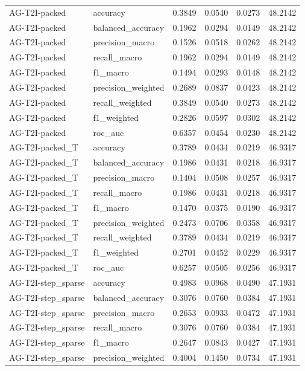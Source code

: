 \begin{tabular}{llrrrr}
AG-T2I-packed & accuracy & 0.3849 & 0.0540 & 0.0273 & 48.2142 \\
AG-T2I-packed & balanced_accuracy & 0.1962 & 0.0294 & 0.0149 & 48.2142 \\
AG-T2I-packed & precision_macro & 0.1526 & 0.0518 & 0.0262 & 48.2142 \\
AG-T2I-packed & recall_macro & 0.1962 & 0.0294 & 0.0149 & 48.2142 \\
AG-T2I-packed & f1_macro & 0.1494 & 0.0293 & 0.0148 & 48.2142 \\
AG-T2I-packed & precision_weighted & 0.2689 & 0.0837 & 0.0423 & 48.2142 \\
AG-T2I-packed & recall_weighted & 0.3849 & 0.0540 & 0.0273 & 48.2142 \\
AG-T2I-packed & f1_weighted & 0.2826 & 0.0597 & 0.0302 & 48.2142 \\
AG-T2I-packed & roc_auc & 0.6357 & 0.0454 & 0.0230 & 48.2142 \\
AG-T2I-packed_T & accuracy & 0.3789 & 0.0434 & 0.0219 & 46.9317 \\
AG-T2I-packed_T & balanced_accuracy & 0.1986 & 0.0431 & 0.0218 & 46.9317 \\
AG-T2I-packed_T & precision_macro & 0.1404 & 0.0508 & 0.0257 & 46.9317 \\
AG-T2I-packed_T & recall_macro & 0.1986 & 0.0431 & 0.0218 & 46.9317 \\
AG-T2I-packed_T & f1_macro & 0.1470 & 0.0375 & 0.0190 & 46.9317 \\
AG-T2I-packed_T & precision_weighted & 0.2473 & 0.0706 & 0.0358 & 46.9317 \\
AG-T2I-packed_T & recall_weighted & 0.3789 & 0.0434 & 0.0219 & 46.9317 \\
AG-T2I-packed_T & f1_weighted & 0.2701 & 0.0452 & 0.0229 & 46.9317 \\
AG-T2I-packed_T & roc_auc & 0.6257 & 0.0505 & 0.0256 & 46.9317 \\
AG-T2I-step_sparse & accuracy & 0.4983 & 0.0968 & 0.0490 & 47.1931 \\
AG-T2I-step_sparse & balanced_accuracy & 0.3076 & 0.0760 & 0.0384 & 47.1931 \\
AG-T2I-step_sparse & precision_macro & 0.2653 & 0.0933 & 0.0472 & 47.1931 \\
AG-T2I-step_sparse & recall_macro & 0.3076 & 0.0760 & 0.0384 & 47.1931 \\
AG-T2I-step_sparse & f1_macro & 0.2647 & 0.0843 & 0.0427 & 47.1931 \\
AG-T2I-step_sparse & precision_weighted & 0.4004 & 0.1450 & 0.0734 & 47.1931 \\

\end{tabular}
